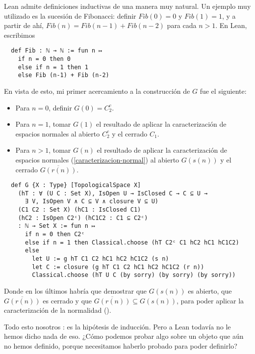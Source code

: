 Lean admite definiciones inductivas de una manera muy natural. Un ejemplo muy utilizado es la sucesión de Fibonacci: definir $Fib(0) = 0$ y $Fib(1) = 1$, y a partir de ahí, $Fib(n) = Fib(n-1)+Fib(n-2)$ para cada $n > 1$. En Lean, escribimos

\begin{lstlisting}
  def Fib : ℕ → ℕ := fun n ↦
    if n = 0 then 0
    else if n = 1 then 1
    else Fib (n-1) + Fib (n-2)
\end{lstlisting}

En vista de esto, mi primer acercamiento a la construcción de $G$ fue el siguiente:

\begin{itemize}
  \item Para $n = 0$, definir $G(0) = C_2^c$.
  \item Para $n = 1$, tomar $G(1)$ el resultado de aplicar la caracterización de espacios normales al abierto $C_2^c$ y el cerrado $C_1$.
  \item Para $n >1$, tomar $G(n)$ el resultado de aplicar la caracterización de espacios normales (\ref{caracterizacion-normal}) al abierto $G(s(n))$ y el cerrado $\overline{G(r(n))}$.
\end{itemize}

\newpage %

\begin{lstlisting}
  def G {X : Type} [TopologicalSpace X]
    (hT : ∀ (U C : Set X), IsOpen U → IsClosed C → C ⊆ U →
      ∃ V, IsOpen V ∧ C ⊆ V ∧ closure V ⊆ U)
    (C1 C2 : Set X) (hC1 : IsClosed C1)
    (hC2 : IsOpen C2ᶜ) (hC1C2 : C1 ⊆ C2ᶜ)
    : ℕ → Set X := fun n ↦
      if n = 0 then C2ᶜ
      else if n = 1 then Classical.choose (hT C2ᶜ C1 hC2 hC1 hC1C2)
      else
        let U := g hT C1 C2 hC1 hC2 hC1C2 (s n)
        let C := closure (g hT C1 C2 hC1 hC2 hC1C2 (r n))
        Classical.choose (hT U C (by sorry) (by sorry) (by sorry))
\end{lstlisting}

Donde en los últimos  habría que demostrar que $G(s(n))$ es abierto, que $\overline{G(r(n))}$ es cerrado y que $\overline{G(r(n))} \subseteq G(s(n))$, para poder aplicar la caracterización de la normalidad ().

Todo esto nosotros : es la hipótesis de inducción. Pero a Lean todavía no le hemos dicho nada de eso. ¿Cómo podemos probar algo sobre un objeto que aún no hemos definido, porque necesitamos haberlo probado para poder definirlo?

